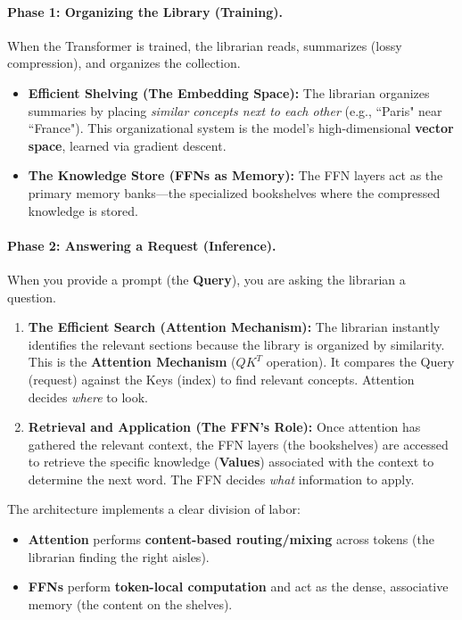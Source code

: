 \documentclass{article}
\begin{document}
\paragraph{Phase 1: Organizing the Library (Training).}
When the Transformer is trained, the librarian reads, summarizes (lossy compression), and organizes the collection.
\begin{itemize}
   \item \textbf{Efficient Shelving (The Embedding Space):} The librarian organizes summaries by placing \emph{similar concepts next to each other} (e.g., ``Paris" near ``France"). This organizational system is the model's high-dimensional \textbf{vector space}, learned via gradient descent.
   \item \textbf{The Knowledge Store (FFNs as Memory):} The FFN layers act as the primary memory banks—the specialized bookshelves where the compressed knowledge is stored.
\end{itemize}

\paragraph{Phase 2: Answering a Request (Inference).}
When you provide a prompt (the \textbf{Query}), you are asking the librarian a question.
\begin{enumerate}
   \item \textbf{The Efficient Search (Attention Mechanism):} The librarian instantly identifies the relevant sections because the library is organized by similarity. This is the \textbf{Attention Mechanism} ($QK^T$ operation). It compares the Query (request) against the Keys (index) to find relevant concepts. Attention decides \emph{where} to look.
   \item \textbf{Retrieval and Application (The FFN's Role):} Once attention has gathered the relevant context, the FFN layers (the bookshelves) are accessed to retrieve the specific knowledge (\textbf{Values}) associated with the context to determine the next word. The FFN decides \emph{what} information to apply.
\end{enumerate}

\begin{tcolorbox}[colback=blue!5!white, colframe=blue!75!black, title=Separation of Concerns]
The architecture implements a clear division of labor:
\begin{itemize}
   \item \textbf{Attention} performs \textbf{content-based routing/mixing} across tokens (the librarian finding the right aisles).
   \item \textbf{FFNs} perform \textbf{token-local computation} and act as the dense, associative memory (the content on the shelves).
\end{itemize}
\end{tcolorbox}
\end{document}
